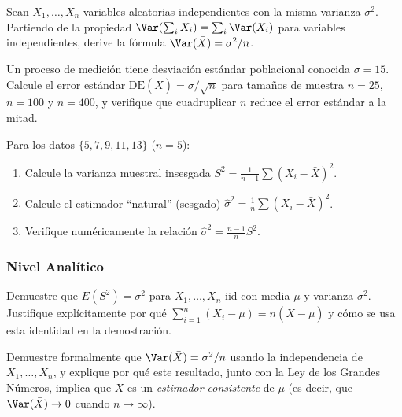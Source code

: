 \begin{problema}
	\label{prob:5.1.4}
	Sean $X_{1}, \ldots, X_{n}$ variables aleatorias independientes con la misma varianza $\sigma^{2}$. Partiendo de la propiedad $\Var(\sum_i X_i) = \sum_i \Var(X_i)$ para variables independientes, derive la fórmula $\Var(\bar{X}) = \sigma^{2}/n$.
\end{problema}

\begin{problema}
	\label{prob:5.1.5}
	Un proceso de medición tiene desviación estándar poblacional conocida $\sigma = 15$. Calcule el error estándar $\text{DE}(\bar{X}) = \sigma/\sqrt{n}$ para tamaños de muestra $n = 25$, $n = 100$ y $n = 400$, y verifique que cuadruplicar $n$ reduce el error estándar a la mitad.
\end{problema}

\begin{problema}
	\label{prob:5.1.6}
	Para los datos $\{5, 7, 9, 11, 13\}$ ($n=5$):
	\begin{enumerate}
		\item Calcule la varianza muestral insesgada $S^{2} = \frac{1}{n-1}\sum(X_i-\bar{X})^{2}$.
		\item Calcule el estimador ``natural'' (sesgado) $\hat{\sigma}^{2} = \frac{1}{n}\sum(X_i-\bar{X})^{2}$.
		\item Verifique numéricamente la relación $\hat{\sigma}^{2} = \frac{n-1}{n}S^{2}$.
	\end{enumerate}
\end{problema}

\subsubsection*{Nivel Analítico}

\begin{problema}
	\label{prob:5.1.7}
	Demuestre que $E(S^{2}) = \sigma^{2}$ para $X_{1}, \ldots, X_{n}$ iid con media $\mu$ y varianza $\sigma^{2}$. Justifique explícitamente por qué $\sum_{i=1}^{n}(X_i-\mu) = n(\bar{X}-\mu)$ y cómo se usa esta identidad en la demostración.
\end{problema}

\begin{problema}
	\label{prob:5.1.8}
	Demuestre formalmente que $\Var(\bar{X}) = \sigma^{2}/n$ usando la independencia de $X_{1}, \ldots, X_{n}$, y explique por qué este resultado, junto con la Ley de los Grandes Números, implica que $\bar{X}$ es un \emph{estimador consistente} de $\mu$ (es decir, que $\Var(\bar{X}) \to 0$ cuando $n \to \infty$).
\end{problema}

